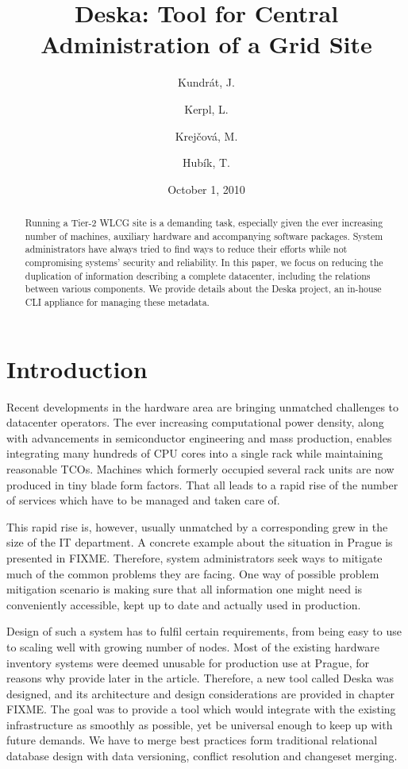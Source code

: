 \documentclass[11pt]{article}
\title{\sc Deska: Tool for Central Administration of a Grid Site}
\author[1,2,*]{Kundrát, J.}
\affil[1]{Institute of Physics of the AS CR, Prague, Czech Republic}
\author[2]{Kerpl, L.}
\author[2]{Krejčová, M.}
\author[2]{Hubík, T.}
\affil[2]{Faculty of Mathematics and Physics, Charles University in Prague, Czech Republic}
\date{October 1, 2010}
\begin{document}
\let\oldthefootnote\thefootnote
\renewcommand{\thefootnote}{\fnsymbol{footnote}}
\let\thefootnote\oldthefootnote

\maketitle
 
\begin{abstract}
Running a Tier-2 WLCG site is a demanding task, especially given the ever
increasing number of machines, auxiliary hardware and accompanying software
packages.  System administrators have always tried to find ways to reduce their
efforts while not compromising systems' security and reliability.  In this
paper, we focus on reducing the duplication of information describing a complete
datacenter, including the relations between various components.  We provide
details about the Deska project, an in-house CLI appliance for managing these
metadata.
\end{abstract}


\section{Introduction}

Recent developments in the hardware area are bringing unmatched challenges to
datacenter operators.  The ever increasing computational power density, along
with advancements in semiconductor engineering and mass production, enables
integrating many hundreds of CPU cores into a single rack while maintaining
reasonable TCOs.  Machines which formerly occupied several rack units are now
produced in tiny blade form factors.  That all leads to a rapid rise of the
number of services which have to be managed and taken care of.

This rapid rise is, however, usually unmatched by a corresponding grew in the
size of the IT department.  A concrete example about the situation in Prague is
presented in FIXME. Therefore, system administrators seek ways to mitigate much
of the common problems they are facing.  One way of possible problem mitigation
scenario is making sure that all information one might need is conveniently
accessible, kept up to date and actually used in production.

Design of such a system has to fulfil certain requirements, from being easy to
use to scaling well with growing number of nodes.  Most of the existing hardware
inventory systems were deemed unusable for production use at Prague, for reasons
why provide later in the article.  Therefore, a new tool called Deska was
designed, and its architecture and design considerations are provided in chapter
FIXME.  The goal was to provide a tool which would integrate with the existing
infrastructure as smoothly as possible, yet be universal enough to keep up with
future demands.  We have to merge best practices form traditional relational
database design with data versioning, conflict resolution and changeset merging.
\end{document}
